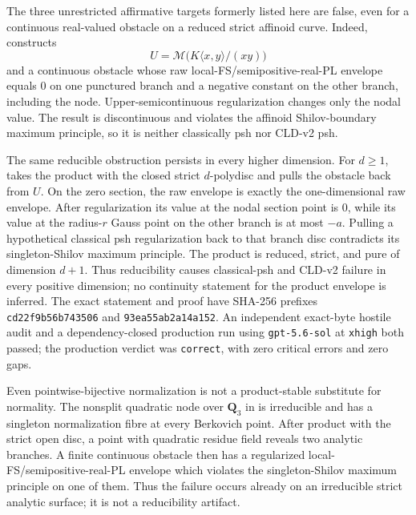 The three unrestricted affirmative targets formerly listed here are false,
even for a continuous real-valued obstacle on a reduced strict affinoid curve.
Indeed,  constructs
\[
 U=\mathcal M\bigl(K\langle x,y\rangle/(xy)\bigr)
\]
and a continuous obstacle whose raw local-FS/semipositive-real-PL envelope
equals \(0\) on one punctured branch and a negative constant on the other
branch, including the node.  Upper-semicontinuous regularization changes only
the nodal value.  The result is discontinuous and violates the affinoid
Shilov-boundary maximum principle, so it is neither classically psh nor
CLD-v2 psh.

The same reducible obstruction persists in every higher dimension.  For
\(d\geq1\), 
takes the product with the closed strict \(d\)-polydisc and pulls the
obstacle back from \(U\).  On the zero section, the raw envelope is exactly
the one-dimensional raw envelope.  After regularization its value at the
nodal section point is \(0\), while its value at the radius-\(r\) Gauss point
on the other branch is at most \(-a\).  Pulling a hypothetical classical psh
regularization back to that branch disc contradicts its singleton-Shilov
maximum principle.  The product is reduced, strict, and pure of dimension
\(d+1\).  Thus reducibility causes classical-psh and CLD-v2 failure in every
positive dimension; no continuity statement for the product envelope is
inferred.  The exact statement and proof have SHA-256 prefixes
\texttt{cd22f9b56b743506} and \texttt{93ea55ab2a14a152}.  An independent
exact-byte hostile audit and a dependency-closed production run using
\texttt{gpt-5.6-sol} at \texttt{xhigh} both passed; the production verdict
was \texttt{correct}, with zero critical errors and zero gaps.

Even pointwise-bijective normalization is not a product-stable substitute
for normality.  The nonsplit quadratic node over \(\mathbf Q_3\) in
 is irreducible
and has a singleton normalization fibre at every Berkovich point.  After
product with the strict open disc, a point with quadratic residue field
reveals two analytic branches.  A finite continuous obstacle then has a
regularized local-FS/semipositive-real-PL envelope which violates the
singleton-Shilov maximum principle on one of them.  Thus the failure occurs
already on an irreducible strict analytic surface; it is not a reducibility
artifact.


